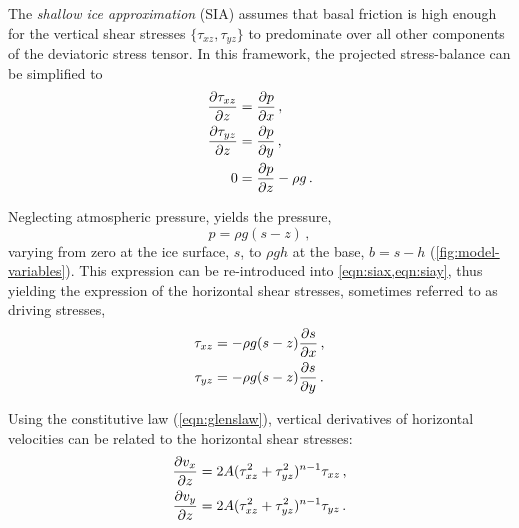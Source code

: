 \documentclass{article}
\newcommand{\todo}[1]{} %
\begin{document}
The \emph{shallow ice approximation} (SIA) assumes that basal friction is high
enough
for the vertical shear stresses $\{\tau_{xz}, \tau_{yz}\}$ to predominate over
all other components of the deviatoric stress tensor. In this framework, the
projected stress-balance can be simplified to
\begin{subequations}
\label{eqn:sia}
\begin{align}
    \label{eqn:siax}
    \pdv{\tau_{xz}}{z} &= \pdv{p}{x} \,, \\
    \label{eqn:siay}
    \pdv{\tau_{yz}}{z} &= \pdv{p}{y} \,, \\
    \label{eqn:siaz}
    0 &= \pdv{p}{z} - \rho g \,.
\end{align}
\end{subequations}

\todo{\citet{Morland.Johnson.1980} derived the SIA in 2D, using a stream
      function. Their equations look very different from here. Go to
      geolibrary and check the book by \citet{Hutter.1983}, if it is there.}

Neglecting atmospheric pressure,  yields the pressure,
\begin{equation}
    p = \rho g (s-z) \,,
\end{equation}
varying from zero at the ice surface, $s$, to $\rho gh$ at the base, ${b=s-h}$
(\cref{fig:model-variables}). This expression
can be re-introduced into \cref{eqn:siax,eqn:siay}, thus yielding the
expression of the horizontal shear stresses, sometimes referred to as driving
stresses,
\begin{subequations}
\begin{align}
    \tau_{xz} &= -\rho g (s-z) \pdv{s}{x} \,, \\
    \tau_{yz} &= -\rho g (s-z) \pdv{s}{y} \,.
\end{align}
\end{subequations}

Using the constitutive law (\ref{eqn:glenslaw}), vertical derivatives of
horizontal velocities can be related to the horizontal shear stresses:
\begin{subequations}
\begin{align}
    \pdv{v_x}{z} &= 2A (\tau_{xz}^2 + \tau_{yz}^2)^{n-1} \tau_{xz} \,, \\
    \pdv{v_y}{z} &= 2A (\tau_{xz}^2 + \tau_{yz}^2)^{n-1} \tau_{yz} \,.
\end{align}
\end{subequations}
\end{document}

